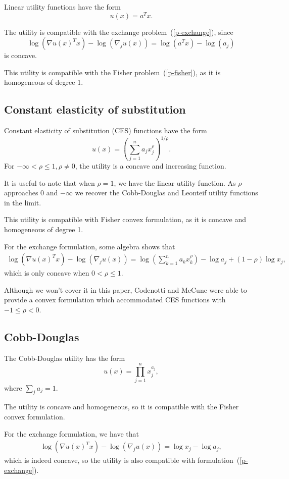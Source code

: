 \documentclass[12pt]{article}
\begin{document}
Linear utility functions have the form
\[
u(x) = a^T x.
\]

The utility is compatible with the exchange problem~(\ref{p-exchange}),
since
\[
\log(\nabla u(x)^T x) - \log(\nabla_j u(x))  = \log(a^T x) - \log(a_j)
\]
is concave.

This utility is compatible with the Fisher problem~(\ref{p-fisher}), as it is
homogeneous of degree 1.


\subsection{Constant elasticity of substitution}
Constant elasticity of substitution (CES) functions have the form
\[
u(x) = \left(\sum_{j=1}^n a_j x_j^\rho \right)^{1/\rho}.
\]
For $-\infty < \rho \leq 1, \rho \neq 0$, the utility is a concave and
increasing function.

It is useful to note that when $\rho = 1$, we have the linear utility function.
As $\rho$ approaches $0$ and $-\infty$ we recover the Cobb-Douglas and Leonteif
utility functions in the limit. %

This utility is compatible with Fisher convex formulation, as it is concave and
homogeneous of degree 1.

For the exchange formulation, some algebra shows that 
\begin{align*}
\log(\nabla u(x)^T x) - \log(\nabla_j u(x)) =
\log\left(\sum_{k=1}^n a_k x_k^\rho \right) - \log a_j + (1-\rho) \log x_j,
\end{align*}
which is only concave when $0 < \rho \leq 1$.

Although we won't cover it in this paper, Codenotti and McCune
\cite{codenotti2005marketCES} were able to provide a convex formulation which
accommodated CES functions with $-1 \leq \rho < 0$.

\subsection{Cobb-Douglas}
The Cobb-Douglas utility has the form
\[
u(x) = \prod_{j=1}^{n} x_j^{a_j},
\]
where $\sum_j a_j = 1$.


The utility is concave and homogeneous, so it is compatible with the Fisher
convex formulation.

For the exchange formulation, we have that
\begin{align*}
\log(\nabla u(x)^T x) - \log(\nabla_j u(x)) =
\log x_j - \log a_j,
\end{align*}
which is indeed concave, so the utility is also compatible with
formulation~(\ref{p-exchange}).
\end{document}
